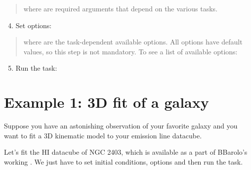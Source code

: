 \documentclass[letterpaper,10pt,english]{sphinxmanual}
\begin{document}
\begin{quote}

where  are required arguments that depend on the various tasks.
\end{quote}
\begin{enumerate}
\setcounter{enumi}{3}
\item {} 
Set options:

\begin{sphinxVerbatim}[commandchars=\\\{\}]
\end{sphinxVerbatim}

\end{enumerate}
\begin{quote}

where  are the task-dependent available options. All options have default values, so this step is not mandatory. To see a list of available options:

\begin{sphinxVerbatim}[commandchars=\\\{\}]
\end{sphinxVerbatim}
\end{quote}
\begin{enumerate}
\setcounter{enumi}{4}
\item {} 
Run the task:

\begin{sphinxVerbatim}[commandchars=\\\{\}]
\end{sphinxVerbatim}

\end{enumerate}


\section{Example 1: 3D fit of a galaxy}
\label{\detokenize{pybb_quickstart:example-1-3d-fit-of-a-galaxy}}
Suppose you have an astonishing observation of your favorite galaxy and you want to fit a 3D kinematic model to your emission line datacube.

Let’s fit the HI datacube of NGC 2403, which is available as a part of BBarolo’s working .
We just have to set initial conditions, options and then run the task.
\end{document}
